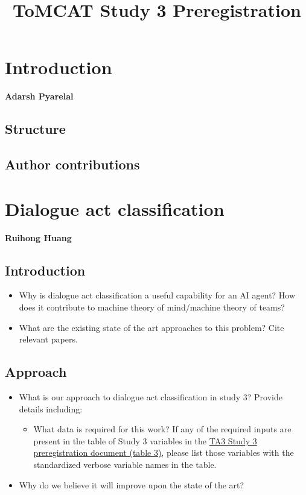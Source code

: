\documentclass[oneside,9pt]{memoir}
\title{ToMCAT Study 3 Preregistration}
\date{}
\begin{document}
\maketitle
\tableofcontents* 

\chapter{Introduction}
\textbf{Adarsh Pyarelal}
\section{Structure}
\section{Author contributions}

\chapter{Dialogue act classification}
\textbf{Ruihong Huang}
\section{Introduction}

\begin{itemize}
    \item Why is dialogue act classification a useful capability for an AI
        agent? How does it contribute to machine theory of mind/machine theory
        of teams?
    \item What are the existing state of the art approaches to this problem?
        Cite relevant papers.
\end{itemize}

\section{Approach}
\begin{itemize}
    \item What is our approach to dialogue act classification in study 3?
        Provide details including:
        \begin{itemize}
            \item What data is required for this work? If any of the required
                inputs are present in the table of Study 3 variables in the
                \href{https://docs.google.com/document/d/1GF7VsNF9R95IAaj6mVZUDV2mAX5ok1Bh6Tcm8zDpIkg/edit#heading=h.1ksv4uv}{TA3
                Study 3 preregistration document (table 3)}, please list those
                variables with the standardized verbose variable names in the table.
        \end{itemize}
    \item Why do we believe it will improve upon the state of the art?
\end{itemize}
\end{document}
